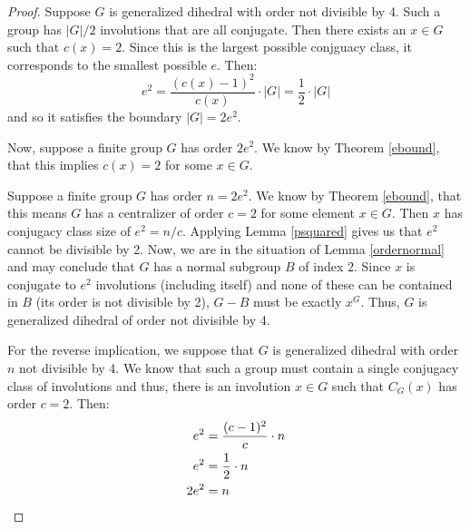 \documentclass[main.tex]{subfiles}
\begin{document}
\begin{proof}
Suppose $G$ is generalized dihedral with order not divisible by 4. Such a group has $|G|/2$ involutions that are all conjugate. Then there exists an $x \in G$ such that $c(x) = 2$. Since this is the largest possible conjguacy class, it corresponds to the smallest possible $e$. Then:
$$e^2 = \frac{(c(x) - 1)^2}{c(x)} \cdot |G| = \frac{1}{2} \cdot |G|$$
and so it satisfies the boundary $|G| = 2e^2$.

Now, suppose a finite group $G$ has order $2e^2$. We know by Theorem \ref{ebound}, that this implies $c(x) = 2$ for some $x \in G$. 

Suppose a finite group $G$ has order $n = 2e^2$. We know by Theorem \ref{ebound}, that this means $G$ has a centralizer of order $c = 2$ for some element $x \in G$. Then $x$ has
conjugacy class size of $e^2 = n / c$. Applying Lemma \ref{psquared} gives us that $e^2$ cannot be divisible by 2. Now, we are in the situation of Lemma \ref{ordernormal} and may conclude that $G$ has a normal subgroup $B$ of index 2. Since $x$ is conjugate to $e^2$ involutions (including itself) and none of these can be contained in $B$ (its order is not divisible by 2), $G - B$ must be exactly $x^G$. Thus, $G$ is generalized dihedral of order not divisible by 4.

For the reverse implication, we suppose that $G$ is generalized dihedral with order $n$ not divisible by 4. We know that such a group must contain a single conjugacy class of involutions and thus, there is an involution $x \in G$ such that $C_G(x)$ has order $c = 2$. Then:
\begin{align*}
e^2 &= \frac{(c - 1)^2}{c} \cdot n\\
e^2 &= \frac{1}{2} \cdot n\\ 
2e^2 &= n \qedhere 
\end{align*}
\end{proof}
\end{document}
